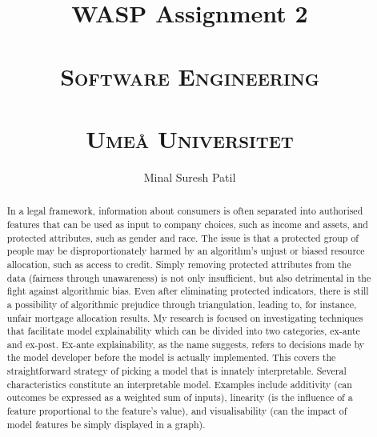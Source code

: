 \documentclass[12pt,a4paper]{article}
\title{%
  WASP Assignment 2 \\~\\
  \textsc{Software Engineering}\\~\\
  \small\textsc{Umeå Universitet}}
\author{Minal Suresh Patil}
\date{}
\begin{document}
\maketitle
\begin{abstract}
In a legal framework, information about consumers is often separated into authorised features that can be used as input to company choices, such as income and assets, and protected attributes, such as gender and race. The issue is that a protected group of people may be disproportionately harmed by an algorithm's unjust or biased resource allocation, such as access to credit. Simply removing protected attributes from the data (fairness through unawareness) is not only insufficient, but also detrimental in the fight against algorithmic bias. Even after eliminating protected indicators, there is still a possibility of algorithmic prejudice through triangulation, leading to, for instance, unfair mortgage allocation results. My research is focused on investigating techniques that facilitate model explainability which can be divided into two categories, ex-ante and ex-post. Ex-ante explainability, as the name suggests, refers to decisions made by the model developer before the model is actually implemented. This covers the straightforward strategy of picking a model that is innately interpretable. Several characteristics constitute an interpretable model. Examples include additivity (can outcomes be expressed as a weighted sum of inputs), linearity (is the influence of a feature proportional to the feature's value), and visualisability (can the impact of model features be simply displayed in a graph).

\end{abstract}
\end{document}
